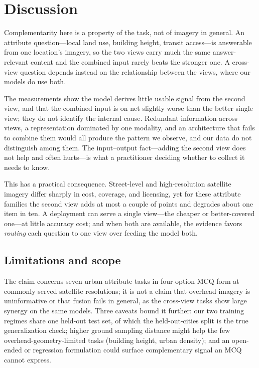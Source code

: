 \section{Discussion}
\label{sec:discussion}

Complementarity here is a property of the task, not of imagery in general. An
attribute question---local land use, building height, transit access---is answerable
from one location's imagery, so the two views carry much the same answer-relevant
content and the combined input rarely beats the stronger one. A cross-view question
depends instead on the relationship between the views, where our models do use both.

The measurements show the model derives little usable signal from the second view,
and that the combined input is on net slightly worse than the better single view;
they do not identify the internal cause. Redundant information across views, a
representation dominated by one modality, and an architecture that fails to combine
them would all produce the pattern we observe, and our data do not distinguish among
them. The input--output fact---adding the second view does not help and often
hurts---is what a practitioner deciding whether to collect it needs to know.

This has a practical consequence. Street-level and high-resolution satellite imagery
differ sharply in cost, coverage, and licensing, yet for these attribute families the
second view adds at most a couple of points and degrades about one item in ten. A
deployment can serve a single view---the cheaper or better-covered one---at little
accuracy cost; and when both are available, the evidence favors \emph{routing} each
question to one view over feeding the model both.

\subsection{Limitations and scope}
\label{sec:limitations}
The claim concerns seven urban-attribute tasks in four-option MCQ form at commonly
served satellite resolutions; it is not a claim that overhead imagery is
uninformative or that fusion fails in general, as the cross-view tasks show large
synergy on the same models. Three caveats bound it further: our two training regimes
share one held-out test set, of which the held-out-cities split is the true
generalization check; higher ground sampling distance might help the few
overhead-geometry-limited tasks (building height, urban density); and an open-ended
or regression formulation could surface complementary signal an MCQ cannot express.

